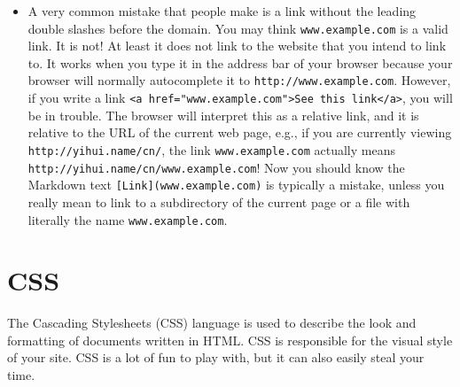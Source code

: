 \documentclass[12pt,]{krantz}
\theoremstyle{definition}
\theoremstyle{definition}
\theoremstyle{definition}
\theoremstyle{remark}
\begin{document}
\begin{itemize}
\begin{itemize}
    will work if the image can be accessed via HTTPS, i.e.,
    \texttt{https://example.com/foo.png}. The main drawback of not
    including the protocol is that such links and paths do not work if
    you open the HTML file locally without using a web server, e.g.,
    only double-click the HTML file in your file browser and show it in
    the browser.\footnote{That is because without a web server, an HTML
      file is viewed via the protocol \texttt{file}. For example, you
      may see a URL of the form \texttt{file://path/to/the/file.html} in
      the address bar of your browser. The path
      \texttt{//example.com/foo.png} will be interpreted as
      \texttt{file://example.com/foo.png}, which is unlikely to exist as
      a local file on your computer.}
  \item
    A very common mistake that people make is a link without the leading
    double slashes before the domain. You may think
    \texttt{www.example.com} is a valid link. It is not! At least it
    does not link to the website that you intend to link to. It works
    when you type it in the address bar of your browser because your
    browser will normally autocomplete it to
    \texttt{http://www.example.com}. However, if you write a link
    \texttt{\textless{}a\ href="www.example.com"\textgreater{}See\ this\ link\textless{}/a\textgreater{}},
    you will be in trouble. The browser will interpret this as a
    relative link, and it is relative to the URL of the current web
    page, e.g., if you are currently viewing
    \texttt{http://yihui.name/cn/}, the link \texttt{www.example.com}
    actually means \texttt{http://yihui.name/cn/www.example.com}! Now
    you should know the Markdown text
    \texttt{{[}Link{]}(www.example.com)} is typically a mistake, unless
    you really mean to link to a subdirectory of the current page or a
    file with literally the name \texttt{www.example.com}.
  \end{itemize}
\end{itemize}

\section{CSS}\label{css}

The Cascading Stylesheets (CSS) language is used to describe
the look and formatting of documents written in HTML. CSS is responsible
for the visual style of your site. CSS is a lot of fun to play with, but
it can also easily steal your time.
\end{document}
